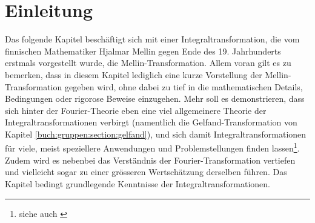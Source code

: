 %
%
%

\section{Einleitung\label{mellin:section:teil0}}

Das folgende Kapitel beschäftigt sich mit einer Integraltransformation,
die vom finnischen Mathematiker Hjalmar Mellin gegen Ende des 19.
Jahrhunderts erstmals vorgestellt wurde, die Mellin-Transformation.
Allem voran gilt es zu bemerken, dass in diesem Kapitel lediglich eine
kurze Vorstellung der Mellin-Transformation gegeben wird, ohne dabei zu
tief in die mathematischen Details, Bedingungen oder rigorose Beweise 
einzugehen.
Mehr soll es demonstrieren, dass sich hinter der Fourier-Theorie eben eine
viel allgemeinere Theorie der Integraltransformationen verbirgt 
(namentlich die Gelfand-Transformation von Kapitel 
\ref{buch:gruppen:section:gelfand}), und sich damit 
Integraltransformationen für viele, meist speziellere Anwendungen und
Problemstellungen finden lassen\footnote{siehe auch \cite{mellin:mendezmueller-book}}.
Zudem wird es nebenbei das Verständnis der Fourier-Transformation vertiefen
und vielleicht sogar zu einer grösseren Wertschätzung derselben führen.
Das Kapitel bedingt grundlegende Kenntnisse der Integraltransformationen.







